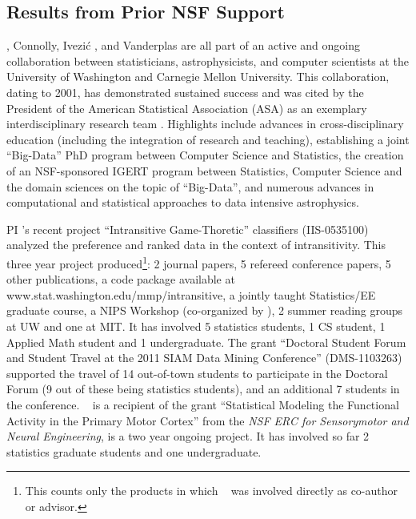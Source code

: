 \subsection{             Results from Prior NSF Support             }
\label{sec:priorNSF}

\meila, Connolly, Ivezi\'{c} , and Vanderplas are all part of an active
and ongoing collaboration between statisticians, astrophysicists, and
computer scientists at the University of Washington and Carnegie
Mellon University.  This collaboration, dating to 2001, has
demonstrated sustained success and was cited by the President of the
American Statistical Association (ASA) as an exemplary
interdisciplinary research team \cite{straf03}. Highlights
include advances in cross-disciplinary education
(including the integration of research and teaching), establishing a
joint ``Big-Data'' PhD program between Computer Science and
Statistics, the creation of an NSF-sponsored IGERT program between
Statistics, Computer Science and the domain sciences on the topic of
``Big-Data'', and numerous advances in computational and statistical
approaches to data intensive astrophysics.

PI \meila's recent project ``Intransitive Game-Thoretic'' classifiers
(IIS-0535100) analyzed the preference and ranked data in the context
of intransitivity. This three year project produced\footnote{This
  counts only the products in which \meila~ was involved directly as
  co-author or advisor.}: 2 journal papers, 5 refereed conference
papers, 5 other publications, a code package available at
{www.stat.washington.edu/mmp/intransitive}, a jointly taught
Statistics/EE graduate course, a NIPS Workshop (co-organized by
\meila), 2 summer reading groups at UW and one at MIT. It has involved
5 statistics students, 1 CS student, 1 Applied Math student and 1
undergraduate. The grant ``Doctoral Student Forum and Student Travel
at the 2011 SIAM Data Mining Conference'' (DMS-1103263) supported the
travel of 14 out-of-town students to participate in the Doctoral Forum
(9 out of these being statistics students), and an additional 7
students in the conference. 
\meila~ is a recipient of the grant ``Statistical Modeling the
Functional Activity in the Primary Motor Cortex'' from the {\em NSF
  ERC for Sensorymotor and Neural Engineering}, is a two year ongoing
project. It has involved so far 2 statistics graduate students and one
undergraduate.

